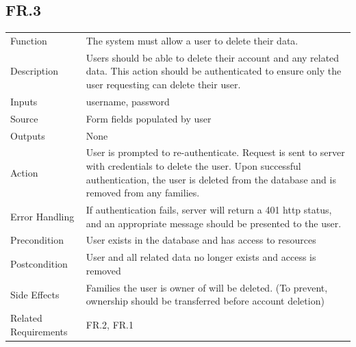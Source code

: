 \documentclass[12pt]{article}
\begin{document}
    \subsection*{FR.3}
    \begin{center}
        \begin{tabular}{| p{10em} p{26em} |}
        \hline
         Function & The system must allow a user to delete their data.\\
         Description & Users should be able to delete their account and any related data. This action should be authenticated to ensure only the user requesting can delete their user.\\
         Inputs & username, password\\
         Source & Form fields populated by user\\
         Outputs & None\\
         Action & User is prompted to re-authenticate. Request is sent to server with credentials to delete the user. Upon successful authentication, the user is deleted from the database and is removed from any families.\\
         Error Handling & If authentication fails, server will return a 401 http status, and an appropriate message should be presented to the user.\\
         Precondition & User exists in the database and has access to resources\\
         Postcondition & User and all related data no longer exists and access is removed\\
         Side Effects & Families the user is owner of will be deleted. (To prevent, ownership should be transferred before account deletion)\\
         Related Requirements & FR.2, FR.1\\
         \hline
        \end{tabular}
    \end{center}
\end{document}
